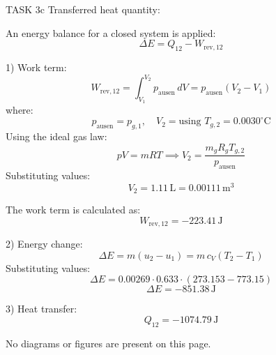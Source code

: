 TASK 3c  
Transferred heat quantity:  

An energy balance for a closed system is applied:  
\[
\Delta E = Q_{12} - W_{\text{rev},12}
\]  

1) Work term:  
\[
W_{\text{rev},12} = \int_{V_1}^{V_2} p_{\text{ausen}} \, dV = p_{\text{ausen}} (V_2 - V_1)
\]  
where:  
\[
p_{\text{ausen}} = p_{g,1}, \quad V_2 = \text{using } T_{g,2} = 0.0030^\circ\text{C}
\]  
Using the ideal gas law:  
\[
pV = mRT \implies V_2 = \frac{m_g R_g T_{g,2}}{p_{\text{ausen}}}
\]  
Substituting values:  
\[
V_2 = 1.11 \, \text{L} = 0.00111 \, \text{m}^3
\]  

The work term is calculated as:  
\[
W_{\text{rev},12} = -223.41 \, \text{J}
\]  

2) Energy change:  
\[
\Delta E = m (u_2 - u_1) = m \, c_V (T_2 - T_1)
\]  
Substituting values:  
\[
\Delta E = 0.00269 \cdot 0.633 \cdot (273.153 - 773.15)
\]  
\[
\Delta E = -851.38 \, \text{J}
\]  

3) Heat transfer:  
\[
Q_{12} = -1074.79 \, \text{J}
\]  

No diagrams or figures are present on this page.